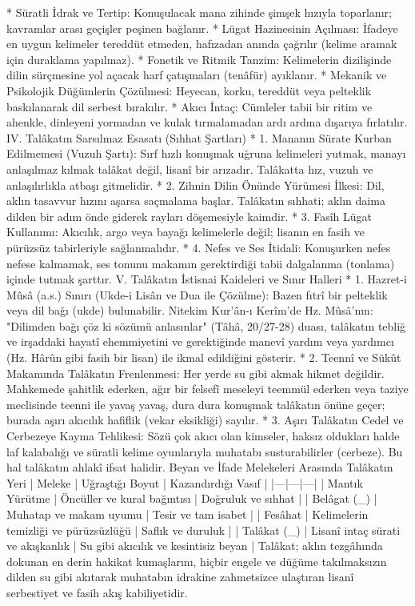 \documentclass[11pt,a4paper]{article}
\begin{document}
 * Süratli İdrak ve Tertip: Konuşulacak mana zihinde şimşek hızıyla toparlanır; kavramlar arası geçişler peşinen bağlanır.
 * Lügat Hazinesinin Açılması: İfadeye en uygun kelimeler tereddüt etmeden, hafızadan anında çağrılır (kelime aramak için duraklama yapılmaz).
 * Fonetik ve Ritmik Tanzim: Kelimelerin dizilişinde dilin sürçmesine yol açacak harf çatışmaları (tenâfür) ayıklanır.
 * Mekanik ve Psikolojik Düğümlerin Çözülmesi: Heyecan, korku, tereddüt veya pelteklik baskılanarak dil serbest bırakılır.
 * Akıcı İntaç: Cümleler tabii bir ritim ve ahenkle, dinleyeni yormadan ve kulak tırmalamadan ardı ardına dışarıya fırlatılır.
IV. Talâkatın Sarsılmaz Esasatı (Sıhhat Şartları)
 * 1. Mananın Sürate Kurban Edilmemesi (Vuzuh Şartı):
   Sırf hızlı konuşmak uğruna kelimeleri yutmak, manayı anlaşılmaz kılmak talâkat değil, lisanî bir arızadır. Talâkatta hız, vuzuh ve anlaşılırlıkla atbaşı gitmelidir.
 * 2. Zihnin Dilin Önünde Yürümesi İlkesi:
   Dil, aklın tasavvur hızını aşarsa saçmalama başlar. Talâkatın sıhhati; aklın daima dilden bir adım önde giderek rayları döşemesiyle kaimdir.
 * 3. Fasîh Lügat Kullanımı:
   Akıcılık, argo veya bayağı kelimelerle değil; lisanın en fasih ve pürüzsüz tabirleriyle sağlanmalıdır.
 * 4. Nefes ve Ses İtidali:
   Konuşurken nefes nefese kalmamak, ses tonunu makamın gerektirdiği tabii dalgalanma (tonlama) içinde tutmak şarttır.
V. Talâkatın İstisnai Kaideleri ve Sınır Halleri
 * 1. Hazret-i Mûsâ (a.s.) Sınırı (Ukde-i Lisân ve Dua ile Çözülme):
   Bazen fıtrî bir pelteklik veya dil bağı (ukde) bulunabilir. Nitekim Kur'ân-ı Kerîm'de Hz. Mûsâ'nın: "Dilimden bağı çöz ki sözümü anlasınlar" (Tâhâ, 20/27-28) duası, talâkatın tebliğ ve irşaddaki hayatî ehemmiyetini ve gerektiğinde manevî yardım veya yardımcı (Hz. Hârûn gibi fasih bir lisan) ile ikmal edildiğini gösterir.
 * 2. Teennî ve Sükût Makamında Talâkatın Frenlenmesi:
   Her yerde su gibi akmak hikmet değildir. Mahkemede şahitlik ederken, ağır bir felsefî meseleyi teemmül ederken veya taziye meclisinde teenni ile yavaş yavaş, dura dura konuşmak talâkatın önüne geçer; burada aşırı akıcılık hafiflik (vekar eksikliği) sayılır.
 * 3. Aşırı Talâkatın Cedel ve Cerbezeye Kayma Tehlikesi:
   Sözü çok akıcı olan kimseler, haksız oldukları halde laf kalabalığı ve süratli kelime oyunlarıyla muhatabı susturabilirler (cerbeze). Bu hal talâkatın ahlakî ifsat halidir.
Beyan ve İfade Melekeleri Arasında Talâkatın Yeri
| Meleke | Uğraştığı Boyut | Kazandırdığı Vasıf |
|---|---|---|
| Mantık Yürütme | Öncüller ve kural bağıntısı | Doğruluk ve sıhhat |
| Belâgat (_{}) | Muhatap ve makam uyumu | Tesir ve tam isabet |
| Fesâhat | Kelimelerin temizliği ve pürüzsüzlüğü | Saflık ve duruluk |
| Talâkat (_{}) | Lisanî intaç sürati ve akışkanlık | Su gibi akıcılık ve kesintisiz beyan |
Talâkat; aklın tezgâhında dokunan en derin hakikat kumaşlarını, hiçbir engele ve düğüme takılmaksızın dilden su gibi akıtarak muhatabın idrakine zahmetsizce ulaştıran lisanî serbestiyet ve fasih akış kabiliyetidir.
\end{document}
